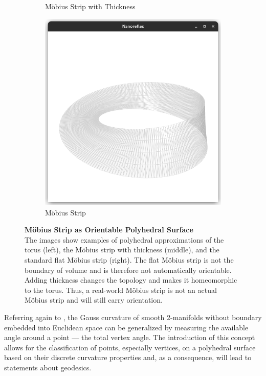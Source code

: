 \documentclass{stdlocal}
\begin{document}
\begin{figure}
\begin{subfigure}[b]{0.32\linewidth}
      \caption{Möbius Strip with Thickness}
    \end{subfigure}
    \hfill
    \begin{subfigure}[b]{0.32\linewidth}
      \centering
      \includegraphics[width=\linewidth,trim={25px 50 25 200},clip]{images/polyhedral-surface-mobius-flat.png}
      \caption{Möbius Strip}
    \end{subfigure}
    \caption[Möbius Strip as Orientable Polyhedral Surface]{%
      \textbf{Möbius Strip as Orientable Polyhedral Surface}\\
      The images show examples of polyhedral approximations of the torus (left), the Möbius strip with thickness (middle), and the standard flat Möbius strip (right).
      The flat Möbius strip is not the boundary of volume and is therefore not automatically orientable.
      Adding thickness changes the topology and makes it homeomorphic to the torus.
      Thus, a real-world Möbius strip is not an actual Möbius strip and will still carry orientation.
    }
    \label{fig:oriented-polyhedral-surface-examples}
  \end{figure}

  Referring again to \textcite{polthier2006}, the Gauss curvature of smooth 2-manifolds without boundary embedded into Euclidean space can be generalized by measuring the available angle around a point --- the total vertex angle.
  The introduction of this concept allows for the classification of points, especially vertices, on a polyhedral surface based on their discrete curvature properties and, as a consequence, will lead to statements about geodesics.
\end{document}

